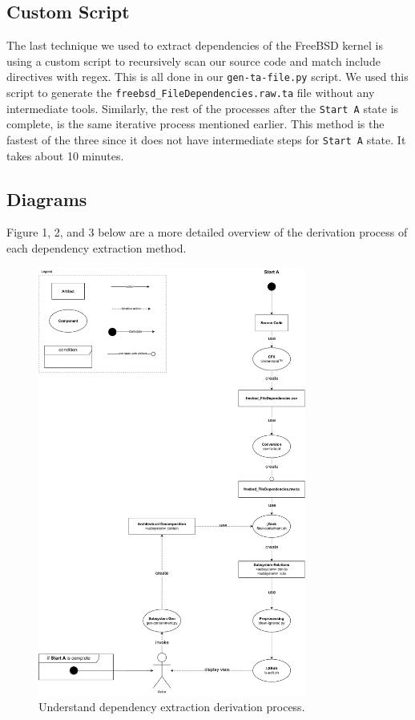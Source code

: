 \documentclass[12pt, dvipsnames, a4paper]{article}
\newcommand{\code}[1]{\texttt{#1}}
\begin{document}
\subsection{Custom Script}
The last technique we used to extract dependencies of the FreeBSD kernel is using a custom script to recursively scan our source code and match include directives with regex. This is all done in our \code{gen-ta-file.py} script. We used this script to generate the \code{freebsd\_FileDependencies.raw.ta} file without any intermediate tools. Similarly, the rest of the processes after the \code{Start A} state is complete, is the same iterative process mentioned earlier. This method is the fastest of the three since it does not have intermediate steps for \code{Start A} state. It takes about 10 minutes.

\subsection{Diagrams}
Figure 1, 2, and 3 below are a more detailed overview of the derivation process of each dependency extraction method.
\begin{figure}[!htb]
	\center
	\includegraphics[width = 250pt]{assets/derivation/understad.pdf}
	\caption{Understand dependency extraction derivation process.\cite{understand}\cite{sourcecode}}
\end{figure}
\end{document}
